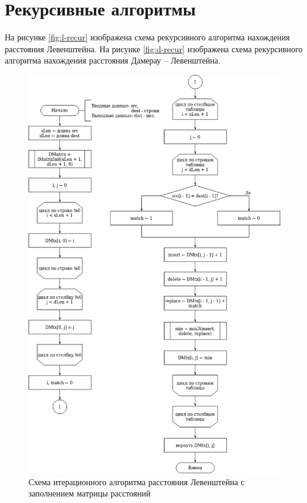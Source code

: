 \section{Рекурсивные алгоритмы}
На рисунке \ref{fig:l-recur} изображена схема рекурсивного алгоритма  нахождения расстояния Левенштейна.
На рисунке \ref{fig:d-recur} изображена схема рекурсивного алгоритма  нахождения расстояния Дамерау -- Левенштейна.
\newpage 
\begin{figure}[h!]
	\begin{center}
		\includegraphics[scale=0.6]{assets/leven-matrix-iter.png}
	\end{center}
	
	\caption{Схема итерационного алгоритма расстояния Левенштейна с заполнением матрицы расстояний}
	\label{fig:l-iter-matrix}
\end{figure}

